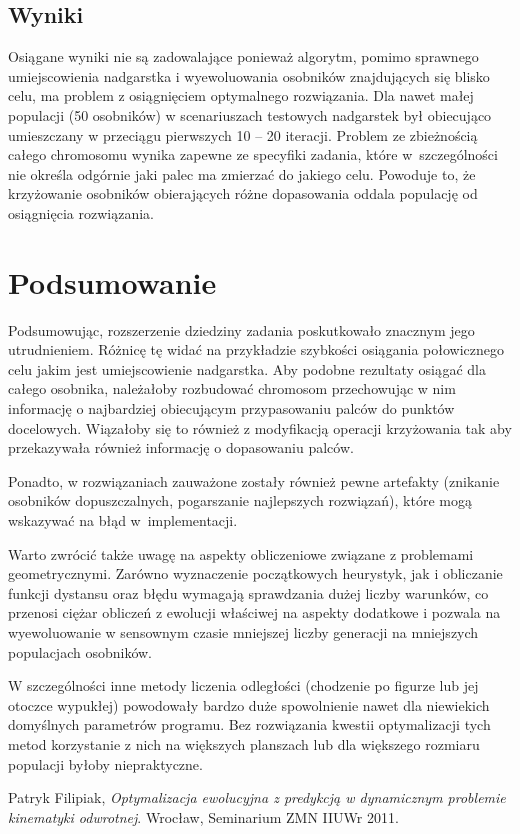 \documentclass[11pt, leqno]{article}
\begin{document}
\subsection{Wyniki}
Osiągane wyniki nie są zadowalające ponieważ algorytm, pomimo sprawnego umiejscowienia nadgarstka i wyewoluowania osobników znajdujących się blisko celu, ma problem z osiągnięciem optymalnego rozwiązania. Dla nawet małej populacji (50 osobników) w scenariuszach testowych nadgarstek był obiecująco umieszczany w przeciągu pierwszych 10 -- 20 iteracji. Problem ze zbieżnością całego chromosomu wynika zapewne ze specyfiki zadania, które w~szczególności nie określa odgórnie jaki palec ma zmierzać do jakiego celu. Powoduje to, że krzyżowanie osobników obierających różne dopasowania oddala populację od osiągnięcia rozwiązania.

\section{Podsumowanie}
Podsumowując, rozszerzenie dziedziny zadania poskutkowało znacznym jego utrudnieniem. Różnicę tę widać na przykładzie szybkości osiągania połowicznego celu jakim jest umiejscowienie nadgarstka. Aby podobne rezultaty osiągać dla całego osobnika, należałoby rozbudować chromosom przechowując w nim informację o najbardziej obiecującym przypasowaniu palców do punktów docelowych. Wiązałoby się to również z modyfikacją operacji krzyżowania tak aby przekazywała również informację o dopasowaniu palców.

Ponadto, w rozwiązaniach zauważone zostały również pewne artefakty (znikanie osobników dopuszczalnych, pogarszanie najlepszych rozwiązań), które mogą wskazywać na błąd w~implementacji.

Warto zwrócić także uwagę na aspekty obliczeniowe związane z problemami geometrycznymi. Zarówno wyznaczenie początkowych heurystyk, jak i obliczanie funkcji dystansu oraz błędu wymagają sprawdzania dużej liczby warunków, co przenosi ciężar obliczeń z ewolucji właściwej na aspekty dodatkowe i pozwala na wyewoluowanie w sensownym czasie mniejszej liczby generacji na mniejszych populacjach osobników. 

W szczególności inne metody liczenia odległości (chodzenie po figurze lub jej otoczce wypukłej) powodowały bardzo duże spowolnienie nawet dla niewiekich domyślnych parametrów programu. Bez rozwiązania kwestii optymalizacji tych metod korzystanie z nich na większych planszach lub dla większego rozmiaru populacji byłoby niepraktyczne.

\begin{thebibliography}{1}
	 Patryk Filipiak, {\it Optymalizacja ewolucyjna z predykcją w dynamicznym problemie kinematyki odwrotnej}. Wrocław, Seminarium ZMN IIUWr 2011.
\end{thebibliography}
\end{document}
